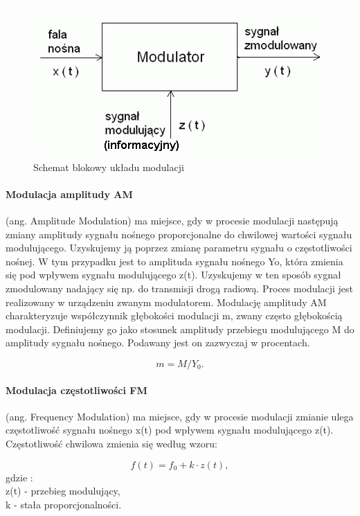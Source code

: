 \documentclass[a4paper,twoside]{report}
\begin{document}
\begin{figure}[htbp]
\centering
\includegraphics[scale=0.7]{obrazy/modulacja_blok.png}
\caption{Schemat blokowy układu modulacji}
\label{rys:modulacja_blok}
\end{figure}
\paragraph{Modulacja amplitudy AM} (ang. Amplitude Modulation) ma miejsce, gdy w procesie modulacji następują zmiany amplitudy sygnału nośnego proporcjonalne do chwilowej wartości sygnału modulującego. Uzyskujemy ją poprzez zmianę parametru sygnału o częstotliwości nośnej. W tym przypadku jest to amplituda sygnału nośnego Yo, która zmienia się pod wpływem sygnału modulującego z(t). Uzyskujemy w ten sposób sygnał zmodulowany nadający się np. do transmisji drogą radiową. Proces modulacji jest realizowany w urządzeniu zwanym modulatorem. Modulację amplitudy AM charakteryzuje współczynnik głębokości modulacji m, zwany często głębokością modulacji. Definiujemy go jako stosunek amplitudy przebiegu modulującego M do amplitudy sygnału nośnego. Podawany jest on zazwyczaj w procentach. 

\begin{equation}
m=M/Y_0.
\end{equation}

\paragraph{Modulacja częstotliwości FM} (ang. Frequency Modulation) ma miejsce, gdy w procesie modulacji zmianie ulega częstotliwość sygnału nośnego x(t) pod wpływem sygnału modulującego z(t). Częstotliwość chwilowa zmienia się według wzoru:

\begin{equation}
f(t)=f_0+k\cdot z(t),
\end{equation}
gdzie : \\
z(t) - przebieg modulujący,\\
k - stała proporcjonalności.\\
\end{document}
